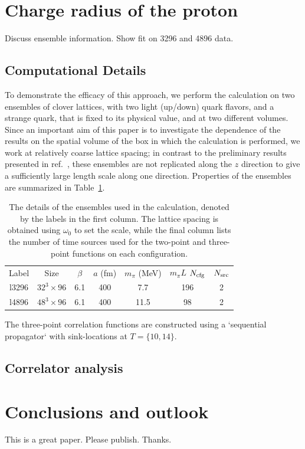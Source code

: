 \documentclass[prd,aps,twocolumn,superscriptaddress,tightenlines,nofootinbib,floatfix,preprintnumbers,10pt]{revtex4-1}
\begin{document}
\section{Charge radius of the proton}\label{sec:results}
{\color{red} Discuss ensemble information. Show fit on 3296 and 4896 data.}
\subsection{Computational Details}
To demonstrate the efficacy of this approach, we perform the
calculation on two ensembles of clover lattices, with two light
(up/down) quark flavors, and a strange quark, that is fixed to its
physical value, and at two different volumes.  Since an important aim
of this paper is to investigate the dependence of the results on the
spatial volume of the box in which the calculation is performed, we
work at relatively coarse lattice spacing; in contrast to the
preliminary results presented in ref.~\cite{Bouchard:2016gmc}, these
ensembles are not replicated along the $z$ direction to give a
sufficiently large length scale along one direction.  Properties of
the ensembles are summarized in Table~\ref{tab:cfg}.
\begin{table}
  \begin{tabular}{ccccccc}
    Label & Size & $\beta$ & $a$ (fm) & $m_\pi$ (MeV) & $m_\pi L$ $N_{\rm cfg}$ & $N_{\rm src}$\\
    l3296 & $32^3 \times 96$ & 6.1 & 400 & 7.7 & 196 & 2\\
    l4896 & $48^3 \times 96$ & 6.1 & 400 & 11.5 & 98 & 2\\
  \end{tabular}
  \caption{The details of the ensembles used in the calculation, denoted by the labels in the first column.  The
    lattice spacing is obtained using $\omega_0$ to set the scale,
    while the final column lists the number of time sources used for
    the two-point and three-point functions on each
    configuration.\label{tab:cfg}}
\end{table}


The three-point correlation functions are constructed using a `sequential propagator` with sink-locations at $T=\{10,14\}$.

\subsection{Correlator analysis}


\section{Conclusions and outlook}
This is a great paper. Please publish. Thanks.

\end{document}
